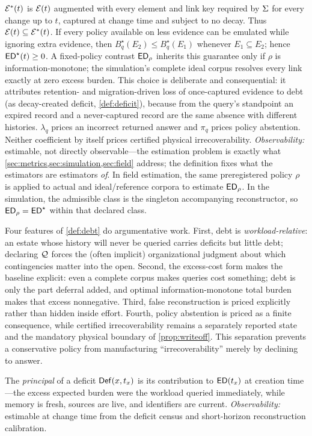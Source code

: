 \begin{definition}
$\mathcal{E}^{*}(t)$ is $\mathcal{E}(t)$ augmented with every element and link key required by
$\Sigma$ for every change up to $t$, captured at change time and subject to no decay.
Thus $\mathcal{E}(t)\subseteq\mathcal{E}^{*}(t)$. If every policy available on less evidence
can be emulated while ignoring extra evidence, then
$B_q^{\star}(E_2)\leq B_q^{\star}(E_1)$ whenever $E_1\subseteq E_2$; hence
$\mathsf{ED}^{\star}(t)\geq0$. A fixed-policy contrast $\mathsf{ED}_\rho$ inherits this guarantee
only if $\rho$ is information-monotone; the simulation's complete ideal corpus
resolves every link exactly at zero excess burden. This choice is deliberate and consequential: it attributes
retention- and migration-driven loss of once-captured evidence to debt (as
decay-created deficit, \cref{def:deficit}), because from the query's standpoint an
expired record and a never-captured record are the same absence with different
histories. $\lambda_q$ prices an incorrect returned answer and $\pi_q$ prices policy
abstention. Neither coefficient by itself prices certified physical
irrecoverability. \emph{Observability:} estimable, not
directly observable---the estimation problem is exactly what
\cref{sec:metrics,sec:simulation,sec:field} address; the definition fixes what the
estimators are estimators \emph{of}. In field estimation, the same preregistered
policy $\rho$ is applied to actual and ideal/reference corpora to estimate
$\mathsf{ED}_\rho$. In the simulation, the admissible class is the singleton accompanying
reconstructor, so $\mathsf{ED}_\rho=\mathsf{ED}^{\star}$ within that declared class.
\end{definition}

Four features of \cref{def:debt} do argumentative work. First, debt is
\emph{workload-relative}: an estate whose history will never be queried carries
deficits but little debt; declaring $\mathcal{Q}$ forces the (often implicit) organizational
judgment about which contingencies matter into the open. Second, the excess-cost
form makes the baseline explicit: even a complete corpus makes queries cost
something; debt is only the part deferral added, and optimal information-monotone
total burden makes that excess nonnegative. Third, false reconstruction is priced
explicitly rather than hidden inside effort. Fourth, policy abstention is priced as
a finite consequence, while certified irrecoverability remains a separately
reported state and the mandatory physical boundary of \cref{prop:writeoff}. This
separation prevents a conservative policy from manufacturing ``irrecoverability''
merely by declining to answer.

\begin{definition}
\label{def:principal}
The \emph{principal} of a deficit $\mathsf{Def}(x, t_x)$ is its contribution to $\mathsf{ED}(t_x)$
at creation time---the excess expected burden were the workload queried immediately,
while memory is fresh, sources are live, and identifiers are current.
\emph{Observability:} estimable at change time from the deficit census and
short-horizon reconstruction calibration.
\end{definition}

